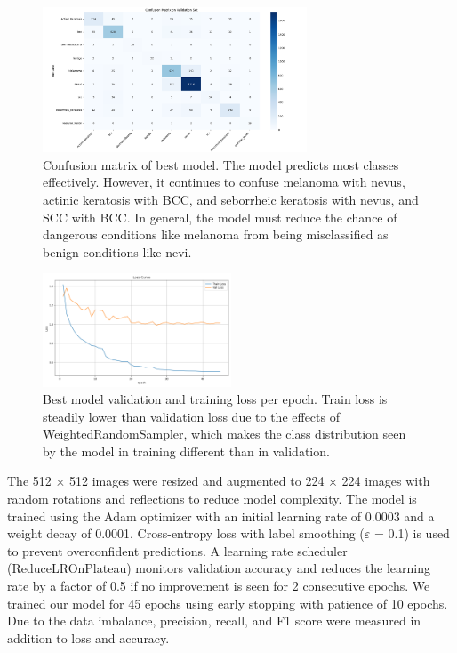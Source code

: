 \documentclass{article} %
\begin{document}
\begin{figure}[h]
\begin{center}
\includegraphics[width=0.7\textwidth]{Figs/confusion_matrix.png}
\end{center}
\caption{Confusion matrix of best model. The model predicts most classes effectively. However, it continues to confuse melanoma with nevus, actinic keratosis with BCC, and seborrheic keratosis with nevus, and SCC with BCC. In general, the model must reduce the chance of dangerous conditions like melanoma from being misclassified as benign conditions like nevi.}
\end{figure}

\begin{figure}[h]
\begin{center}
\includegraphics[width=0.5\textwidth]{Figs/training_validation_loss.png}
\end{center}
\caption{Best model validation and training loss per epoch. Train loss is steadily lower than validation loss due to the effects of WeightedRandomSampler, which makes the class distribution seen by the model in training different than in validation.}
\end{figure}

The 512 × 512 images were resized and augmented to 224 × 224 images with random rotations and reflections to reduce model complexity. The model is trained using the Adam optimizer with an initial learning rate of 0.0003 and a weight decay of 0.0001. Cross-entropy loss with label smoothing ($\varepsilon$ = 0.1) is used to prevent overconfident predictions. A learning rate scheduler (ReduceLROnPlateau) monitors validation accuracy and reduces the learning rate by a factor of 0.5 if no improvement is seen for 2 consecutive epochs. We trained our model for 45 epochs using early stopping with patience of 10 epochs. Due to the data imbalance, precision, recall, and F1 score were measured in addition to loss and accuracy.
\end{document}
